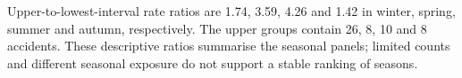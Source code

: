 Upper-to-lowest-interval rate ratios are 1.74, 3.59, 4.26 and 1.42 in winter, spring, summer and autumn, respectively. The upper groups contain 26, 8, 10 and 8 accidents. These descriptive ratios summarise the seasonal panels; limited counts and different seasonal exposure do not support a stable ranking of seasons.

